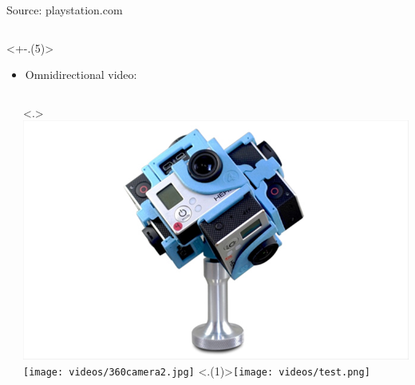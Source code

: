 \begin{frame}[c]
\begin{columns}[T]
\begin{column}{0.35\linewidth}
            \vspace{-0.25cm}
            {\tiny Source: playstation.com}
        \end{column}
      \end{columns}

   \vfill
   \begin{minipage}[t][7cm][t]{\textwidth}
      \only<+-.(5)>{
         \begin{itemize}[<+->]
            \item Omnidirectional video:
         \end{itemize}
         \begin{columns}[T]
            \begin{column}{0.5\linewidth}
               \begin{independentCounter}
                  
               \end{independentCounter}
            \end{column}
            \begin{column}{0.5\linewidth}
               \only<.>{
                  \includegraphics[scale=0.15]{videos/360camera1.png}
                  \texttt{[image: videos/360camera2.jpg]}
                  \setcounter{tmpCounter}{\value{beamerpauses}}
               }
               \only<.(1)>{\hspace{2cm}\texttt{[image: videos/test.png]}}

\end{column}
\end{columns}}
\end{minipage}
\end{frame}
